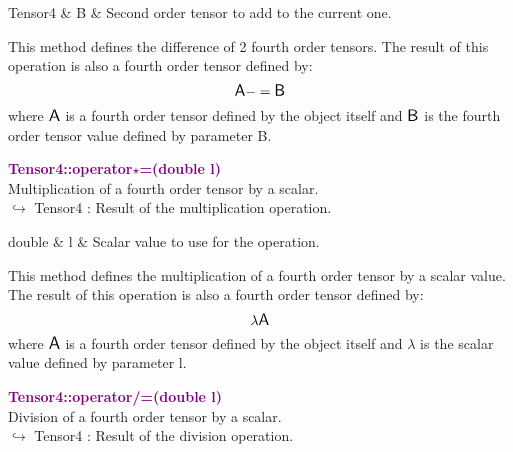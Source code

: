 \begin{tcolorbox}[width=\textwidth,myArgs,tabularx={ll|R}]
Tensor4 & B & Second order tensor to add to the current one.
\end{tcolorbox}

This method defines the difference of 2 fourth order tensors.
The result of this operation is also a fourth order tensor defined by:
\begin{equation*}
\mbox{\large\ensuremath{\mathsf{A}}} -= \mbox{\large\ensuremath{\mathsf{B}}}
\end{equation*}
where $\mbox{\large\ensuremath{\mathsf{A}}}$ is a fourth order tensor defined by the object itself and $\mbox{\large\ensuremath{\mathsf{B}}}$ is the fourth order tensor value defined by parameter B.

\textcolor{purple}{\textbf{Tensor4::operator$\star$=(double l)}}\label{Tensor4::operator*=(double l)}\\
Multiplication of a fourth order tensor by a scalar.\\ \hspace*{10mm}$\hookrightarrow$ Tensor4 : Result of the multiplication operation.

\begin{tcolorbox}[width=\textwidth,myArgs,tabularx={ll|R}]
double & l & Scalar value to use for the operation.
\end{tcolorbox}

This method defines the multiplication of a fourth order tensor by a scalar value.
The result of this operation is also a fourth order tensor defined by:
\begin{equation*}
\lambda \mbox{\large\ensuremath{\mathsf{A}}}
\end{equation*}
where $\mbox{\large\ensuremath{\mathsf{A}}}$ is a fourth order tensor defined by the object itself and $\lambda$ is the scalar value defined by parameter l.

\textcolor{purple}{\textbf{Tensor4::operator/=(double l)}}\label{Tensor4::operator/=(double l)}\\
Division of a fourth order tensor by a scalar.\\ \hspace*{10mm}$\hookrightarrow$ Tensor4 : Result of the division operation.

